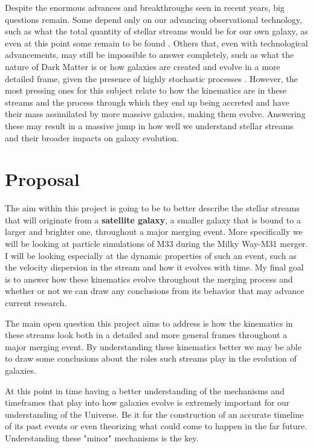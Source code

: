 \documentclass[linenumbers,trackchanges,twocolumn]{aastex7}
\begin{document}
Despite the enormous advances and breakthroughs seen in recent years, big questions remain. Some depend only on our advancing observational technology, such as what the total quantity of stellar streams would be for our own galaxy, as even at this point some remain to be found \citep{Shipp2023-qz}. Others that, even with technological advancements, may still be impossible to answer completely, such as what the nature of Dark Matter is or how galaxies are created and evolve in a more detailed frame, given the presence of highly stochastic processes \citep{Amorisco2017-oc}. However, the most pressing ones for this subject relate to how the kinematics are in these streams and the process through which they end up being accreted and have their mass assimilated by more massive galaxies, making them evolve. Answering these may result in a massive jump in how well we understand stellar streams and their broader impacts on galaxy evolution. 




\section{Proposal} \label{sec:proposal}

The aim within this project is going to be to better describe the stellar streams that will originate from a \textbf{satellite galaxy}, a smaller galaxy that is bound to a larger and brighter one, throughout a major merging event. More specifically we will be looking at particle simulations of M33 during the Milky Way-M31 merger. I will be looking especially at the dynamic properties of such an event, such as the velocity dispersion in the stream and how it evolves with time. My final goal is to answer how these kinematics evolve throughout the merging process and whether or not we can draw any conclusions from its behavior that may advance current research. 

The main open question this project aims to address is how the kinematics in these streams look both in a detailed and more general frames throughout a major merging event. By understanding these kinematics better we may be able to draw some conclusions about the roles such streams play in the evolution of galaxies.

At this point in time having a better understanding of the mechanisms and timeframes that play into how galaxies evolve is extremely important for our understanding of the Universe. Be it for the construction of an accurate timeline of its past events or even theorizing what could come to happen in the far future. Understanding these "minor" mechanisms is the key.
\end{document}

